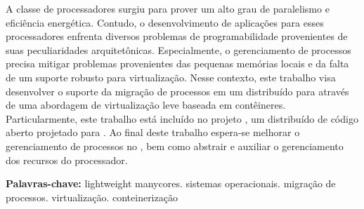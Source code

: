 \begin{resumo}[Resumo]
  A classe de processadores \lws surgiu para prover um alto grau de paralelismo e eficiência energética. Contudo, o desenvolvimento de aplicações para esses processadores enfrenta diversos problemas de programabilidade provenientes de suas peculiaridades arquitetônicas. Especialmente, o gerenciamento de processos precisa mitigar problemas provenientes das pequenas memórias locais e da falta de um suporte robusto para virtualização. Nesse contexto, este trabalho visa desenvolver o suporte da migração de processos em um \os distribuído para \lws através de uma abordagem de virtualização leve baseada em contêineres. Particularmente, este trabalho está incluído no projeto \nanvix, um \os distribuído de código aberto projetado para \lws. Ao final deste trabalho espera-se melhorar o gerenciamento de processos no \nanvix, bem como abstrair e auxiliar o gerenciamento dos recursos do processador.

  \vspace{\baselineskip} 
  \textbf{Palavras-chave:} lightweight manycores. sistemas operacionais. migração de processos. virtualização. conteinerização
\end{resumo}
